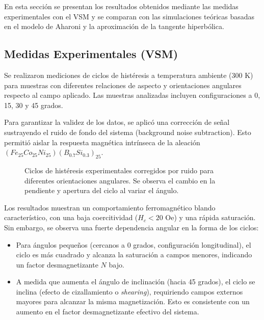 En esta sección se presentan los resultados obtenidos mediante las medidas experimentales con el VSM y se comparan con las simulaciones teóricas basadas en el modelo de Aharoni y la aproximación de la tangente hiperbólica.

\subsection{Medidas Experimentales (VSM)}

Se realizaron mediciones de ciclos de histéresis a temperatura ambiente (300 K) para muestras con diferentes relaciones de aspecto y orientaciones angulares respecto al campo aplicado. Las muestras analizadas incluyen configuraciones a 0, 15, 30 y 45 grados.

Para garantizar la validez de los datos, se aplicó una corrección de señal sustrayendo el ruido de fondo del sistema (background noise subtraction). Esto permitió aislar la respuesta magnética intrínseca de la aleación $(Fe_{25}Co_{25}Ni_{25})(B_{0.7}Si_{0.3})_{25}$.

\begin{figure}[H]
    \centering
    \caption{Ciclos de histéresis experimentales corregidos por ruido para diferentes orientaciones angulares. Se observa el cambio en la pendiente y apertura del ciclo al variar el ángulo.}
    \label{fig:resultados_vsm}
\end{figure}

Los resultados muestran un comportamiento ferromagnético blando característico, con una baja coercitividad ($H_c < 20$ Oe) y una rápida saturación. Sin embargo, se observa una fuerte dependencia angular en la forma de los ciclos:
\begin{itemize}
    \item Para ángulos pequeños (cercanos a 0 grados, configuración longitudinal), el ciclo es más cuadrado y alcanza la saturación a campos menores, indicando un factor desmagnetizante $N$ bajo.
    \item A medida que aumenta el ángulo de inclinación (hacia 45 grados), el ciclo se inclina (efecto de cizallamiento o \textit{shearing}), requiriendo campos externos mayores para alcanzar la misma magnetización. Esto es consistente con un aumento en el factor desmagnetizante efectivo del sistema.
\end{itemize}

